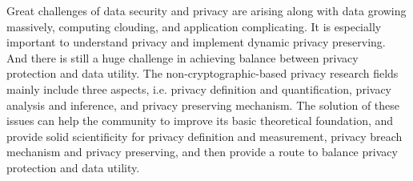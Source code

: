\begin{englishabstract}
	Great challenges of data security and privacy are arising along with data growing massively, computing clouding, and application complicating. It is especially important to understand privacy and implement dynamic privacy preserving. And there is still a huge challenge in achieving balance between privacy protection and data utility. The non-cryptographic-based privacy research fields mainly include three aspects, i.e. privacy definition and quantification, privacy analysis and inference, and privacy preserving mechanism. The solution of these issues can help the community to improve its basic theoretical foundation, and provide solid scientificity for privacy definition and measurement, privacy breach mechanism and privacy preserving, and then provide a
	route to balance privacy protection and data utility. 
	

\end{englishabstract}
